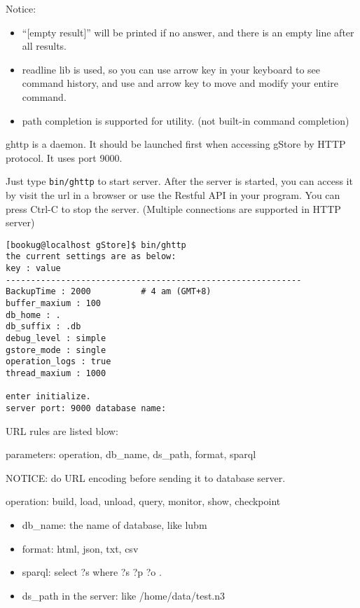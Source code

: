 \documentclass[titlepage, a4paper, 12pt]{article}
\begin{document}
Notice:

\begin{itemize}
\item
  ``{[}empty result{]}'' will be printed if no answer, and there is an
  empty line after all results.
\item
  readline lib is used, so you can use arrow key in your keyboard to see
  command history, and use and arrow key to move and modify your entire
  command.
\item
  path completion is supported for utility. (not built-in command
  completion)
\end{itemize}


ghttp is a daemon. It should be launched first when accessing gStore by HTTP protocol. It uses port 9000.

Just type \texttt{bin/ghttp} to start server. After the server is started, you can access it by visit the url in a browser or use the Restful API in your program. You can press Ctrl-C to stop the server. (Multiple connections are supported in HTTP server)

\begin{verbatim}
[bookug@localhost gStore]$ bin/ghttp
the current settings are as below:
key : value
-----------------------------------------------------------
BackupTime : 2000          # 4 am (GMT+8)
buffer_maxium : 100
db_home : .
db_suffix : .db
debug_level : simple
gstore_mode : single
operation_logs : true
thread_maxium : 1000

enter initialize.
server port: 9000 database name: 

\end{verbatim}

URL rules are listed blow:  

parameters: operation, db\_name, ds\_path, format, sparql

NOTICE: do URL encoding before sending it to database server.

operation: build, load, unload, query, monitor, show, checkpoint
\begin{itemize}
	\item 
	db\_name: the name of database, like lubm
	\item 
	format: html, json, txt, csv
	\item 
	sparql: select ?s where { ?s ?p ?o . }
	\item 
	ds\_path in the server: like /home/data/test.n3				
\end{itemize}
\end{document}
